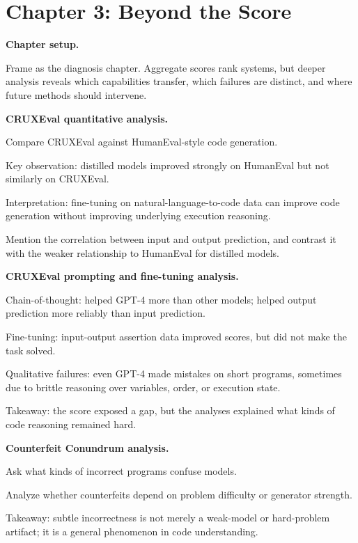 \documentclass[10pt,twocolumn]{article}
\let\olditemize\itemize
\let\oldenditemize\enditemize
\renewenvironment{itemize}{\olditemize
  \setlength{\itemsep}{1pt}
  \setlength{\parskip}{0pt}
  \setlength{\parsep}{0pt}
  \setlength{\topsep}{2pt}
}{\oldenditemize}
\begin{document}
\section*{Chapter 3: Beyond the Score}

\textbf{Chapter setup.}
\begin{itemize}
  \item Frame as the diagnosis chapter. Aggregate scores rank systems, but deeper analysis reveals which capabilities transfer, which failures are distinct, and where future methods should intervene.
\end{itemize}

\textbf{CRUXEval quantitative analysis.}
\begin{itemize}
  \item Compare CRUXEval against HumanEval-style code generation.
  \item Key observation: distilled models improved strongly on HumanEval but not similarly on CRUXEval.
  \item Interpretation: fine-tuning on natural-language-to-code data can improve code generation without improving underlying execution reasoning.
  \item Mention the correlation between input and output prediction, and contrast it with the weaker relationship to HumanEval for distilled models.
\end{itemize}

\textbf{CRUXEval prompting and fine-tuning analysis.}
\begin{itemize}
  \item Chain-of-thought: helped GPT-4 more than other models; helped output prediction more reliably than input prediction.
  \item Fine-tuning: input-output assertion data improved scores, but did not make the task solved.
  \item Qualitative failures: even GPT-4 made mistakes on short programs, sometimes due to brittle reasoning over variables, order, or execution state.
  \item Takeaway: the score exposed a gap, but the analyses explained what kinds of code reasoning remained hard.
\end{itemize}

\textbf{Counterfeit Conundrum analysis.}
\begin{itemize}
  \item Ask what kinds of incorrect programs confuse models.
  \item Analyze whether counterfeits depend on problem difficulty or generator strength.
  \item Takeaway: subtle incorrectness is not merely a weak-model or hard-problem artifact; it is a general phenomenon in code understanding.
\end{itemize}
\end{document}
